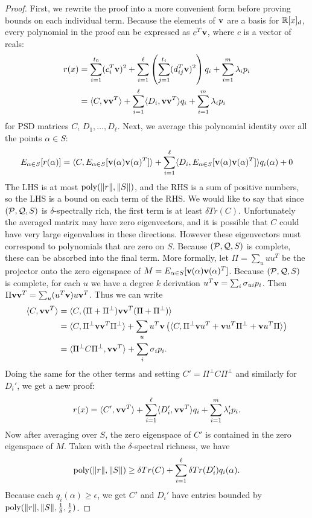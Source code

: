 \begin{proof}
First, we rewrite the proof into a more convenient form before proving bounds on each individual term. Because the elements of ${\bf v}$ are a basis for $\mathbb R[x]_d$, every polynomial in the proof can be expressed as $c^T{\bf v}$, where $c$ is a vector of reals:
\begin{align*} r(x) &= \sum_{i=1}^{t_0} (c_i^T{\bf v})^2 + \sum_{i=1}^\ell \left(\sum_{j=1}^{t_i} (d_{ij}^T{\bf v})^2\right)q_i + \sum_{i=1}^m \lambda_i p_i \\
&= \langle C, {\bf v}{\bf v}^T\rangle + \sum_{i=1}^\ell \langle D_i, {\bf v}{\bf v}^T\rangle q_i + \sum_{i=1}^m \lambda_i p_i
\end{align*}
for PSD matrices $C$, $D_1,\dots,D_\ell$. Next, we average this polynomial identity over all the points $\alpha \in S$:
\begin{align*}
E_{\alpha \in S}[r(\alpha)] &= \langle C, E_{\alpha \in S}[{\bf v}(\alpha){\bf v}(\alpha)^T]\rangle + \sum_{i=1}^\ell \langle D_i, E_{\alpha \in S}[{\bf v}(\alpha){\bf v}(\alpha)^T]\rangle q_i(\alpha) + 0 \\
\end{align*}
The LHS is at most $\operatorname{poly}(\|r\|, \|S\|)$, and the RHS is a sum of positive numbers, so the LHS is a bound on each term of the RHS. We would like to say that since $(\mathcal P, \mathcal Q, S)$ is $\delta$-spectrally rich, the first term is at least $\delta Tr(C)$. Unfortunately the averaged matrix may have zero eigenvectors, and it is possible that $C$ could have very large eigenvalues in these directions. However these eigenvectors must correspond to polynomials that are zero on $S$. Because $(\mathcal P, \mathcal Q, S)$ is complete, these can be absorbed into the final term. More formally, let $\Pi = \sum_u uu^T$ be the projector onto the zero eigenspace of $M = E_{\alpha \in S}[{\bf v}(\alpha){\bf v}(\alpha)^T]$. Because $(\mathcal P, \mathcal Q, S)$ is complete, for each $u$ we have a degree $k$ derivation $u^T{\bf v} = \sum_i \sigma_{ui} p_i$. Then $\Pi {\bf v}{\bf v}^T = \sum_u (u^T{\bf v}) u{\bf v}^T$. Thus we can write
\begin{align*}
\langle C, {\bf v}{\bf v}^T\rangle &= \langle C, (\Pi + \Pi^\perp){\bf v}{\bf v}^T(\Pi + \Pi^\perp)\rangle \\
&= \langle C, \Pi^\perp {\bf v}{\bf v}^T \Pi^\perp\rangle + \sum_u u^T{\bf v}\left(\langle C, \Pi^\perp {\bf v}u^T + {\bf v}u^T\Pi^\perp + {\bf v}u^T\Pi\rangle\right) \\
&= \langle \Pi^\perp C \Pi^\perp, {\bf v}{\bf v}^T\rangle + \sum_i \sigma_i p_i.
\end{align*}
Doing the same for the other terms and setting $C' = \Pi^\perp C \Pi^\perp$ and similarly for $D_i'$, we get a new proof:
\[r(x) = \langle C', {\bf v}{\bf v}^T\rangle + \sum_{i=1}^\ell \langle D_i', {\bf v}{\bf v}^T\rangle q_i + \sum_{i=1}^m \lambda_i' p_i.\]
Now after averaging over $S$, the zero eigenspace of $C'$ is contained in the zero eigenspace of $M$. Taken with the $\delta$-spectral richness, we have
\[\operatorname{poly}(\|r\|,\|S\|) \geq \delta Tr(C) + \sum_{i=1}^\ell \delta Tr(D_i') q_i(\alpha).\]
Because each $q_i(\alpha) \geq \epsilon$, we get $C'$ and $D_i'$ have entries bounded by $\operatorname{poly}(\|r\|, \|S\|, \frac{1}{\delta}, \frac{1}{\varepsilon})$.


\end{proof}

